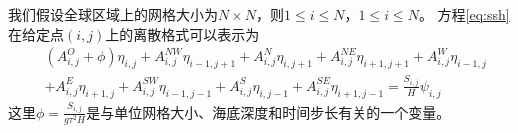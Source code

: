 我们假设全球区域上的网格大小为$N\times N$，则$1\le i\le N$，$1\le i\le N$。  
方程\ref{eq:ssh}在给定点$(i,j)$上的离散格式可以表示为  
\begin{align}
\label{eq:sten}
&(A_{i,j}^O+\phi ) \eta_{i,j}+A_{i,j}^{NW}\eta_{i-1,j+1}+A_{i,j}^N\eta_{i,j+1} +A_{i,j}^{NE}\eta_{i+1,j+1}+A_{i,j}^W\eta_{i-1,j}  \nonumber\\
& +A_{i,j}^E\eta_{i+1,j} +A_{i,j}^{SW}\eta_{i-1,j-1} +A_{i,j}^S\eta_{i,j-1}+ A_{i,j }^{SE}\eta_{i+1,j-1}= \frac{S_{i,j}}{H}\psi_{i,j}
\end{align}
这里$\phi = \frac{S_{i,j}}{g \tau^2H}$是与单位网格大小、海底深度和时间步长有关的一个变量。


